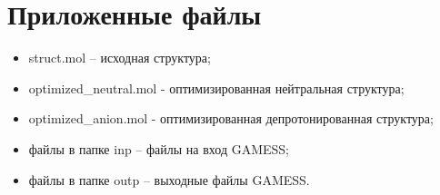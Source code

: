 \section{Приложенные файлы}
\begin{itemize}
    \item struct.mol – исходная структура;
    \item optimized_neutral.mol - оптимизированная нейтральная структура;
    \item optimized_anion.mol - оптимизированная депротонированная структура;
    \item файлы в папке inp – файлы на вход GAMESS;
    \item файлы в папке outp – выходные файлы GAMESS.
\end{itemize}{}